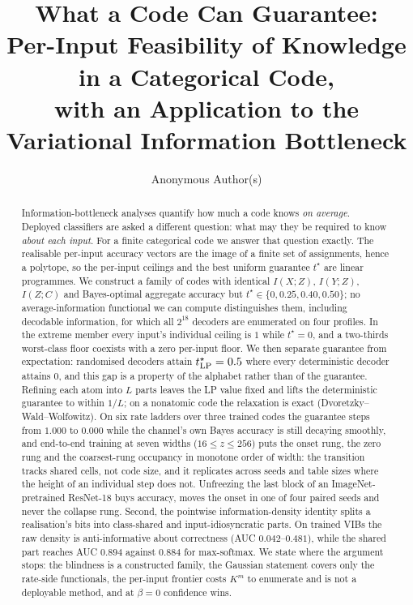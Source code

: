 \documentclass[11pt]{article}
\title{What a Code Can Guarantee:\\ Per-Input Feasibility of Knowledge in a Categorical Code,\\
with an Application to the Variational Information Bottleneck}
\author{Anonymous Author(s)}
\date{}
\begin{document}
\maketitle

\begin{abstract}
Information-bottleneck analyses quantify how much a code knows \emph{on average}. Deployed
classifiers are asked a different question: what may they be required to know \emph{about each
input}. For a finite categorical code we answer that question exactly. The realisable per-input
accuracy vectors are the image of a finite set of assignments, hence a polytope, so the per-input
ceilings and the best uniform guarantee $t^\star$ are linear programmes. We construct a family of
codes with identical $I(X;Z)$, $I(Y;Z)$, $I(Z;C)$ and Bayes-optimal aggregate accuracy but
$t^\star\in\{0,0.25,0.40,0.50\}$; no average-information functional we can compute distinguishes
them, including decodable information, for which all $2^{18}$ decoders are enumerated on four
profiles. In the extreme member every input's individual ceiling is $1$ while $t^\star=0$, and a
two-thirds worst-class floor coexists with a zero per-input floor. We then separate guarantee from
expectation: randomised decoders attain $t^\star_{\rm LP}=0.5$ where every deterministic decoder
attains $0$, and this gap is a property of the alphabet rather than of the guarantee. Refining each
atom into $L$ parts leaves the LP value fixed and lifts the deterministic guarantee to within $1/L$;
on a nonatomic code the relaxation is exact (Dvoretzky--Wald--Wolfowitz). On six rate ladders over
three trained codes the guarantee steps from $1.000$ to $0.000$ while the channel's own Bayes
accuracy is still decaying smoothly, and end-to-end training at seven widths ($16\le z\le256$) puts
the onset rung, the zero rung and the coarsest-rung occupancy in monotone order of width: the
transition tracks shared cells, not code size, and it replicates across seeds and table sizes where
the height of an individual step does not. Unfreezing the last block of an ImageNet-pretrained
ResNet-18 buys accuracy, moves the onset in one of four paired seeds and never the collapse rung.
Second, the pointwise information-density identity splits a
realisation's bits into class-shared and input-idiosyncratic parts. On trained VIBs the raw density
is anti-informative about correctness (AUC $0.042$--$0.481$), while the shared part reaches AUC
$0.894$ against $0.884$ for max-softmax. We state where the argument stops: the blindness is a
constructed family, the Gaussian statement covers only the rate-side functionals, the per-input
frontier costs $K^m$ to enumerate and is not a deployable method, and at $\beta=0$ confidence
wins.
\end{abstract}
\end{document}
